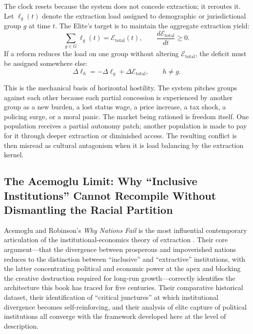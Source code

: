 The clock resets because the system does not concede extraction; it reroutes it. Let $\ell_g(t)$ denote the extraction load assigned to demographic or jurisdictional group $g$ at time $t$. The Elite's target is to maintain the aggregate extraction yield:
\begin{equation}\label{eq:12.2a-load-balancing}
\sum_{g \in G} \ell_g(t) = \mathcal{E}_{\text{total}}(t),
\qquad
\frac{d\mathcal{E}_{\text{total}}}{dt} \geq 0 .
\end{equation}
If a reform reduces the load on one group without altering $\mathcal{E}_{\text{total}}$, the deficit must be assigned somewhere else:
\begin{equation}\label{eq:12.2b-load-transfer}
\Delta \ell_h
=
-\Delta \ell_g
+ \Delta \mathcal{E}_{\text{total}},
\qquad h \neq g .
\end{equation}

This is the mechanical basis of horizontal hostility. The system pitches groups against each other because each partial concession is experienced by another group as a new burden, a lost status wage, a price increase, a tax shock, a policing surge, or a moral panic. The market being rationed is freedom itself. One population receives a partial autonomy patch; another population is made to pay for it through deeper extraction or diminished access. The resulting conflict is then misread as cultural antagonism when it is load balancing by the extraction kernel.

\subsection{The Acemoglu Limit: Why ``Inclusive Institutions'' Cannot Recompile Without Dismantling the Racial Partition}
\label{sec:acemoglu_limit}

Acemoglu and Robinson's \textit{Why Nations Fail} is the most influential contemporary articulation of the institutional-economics theory of extraction \cite{acemoglu_robinson}. Their core argument---that the divergence between prosperous and impoverished nations reduces to the distinction between ``inclusive'' and ``extractive'' institutions, with the latter concentrating political and economic power at the apex and blocking the creative destruction required for long-run growth---correctly identifies the architecture this book has traced for five centuries. Their comparative historical dataset, their identification of ``critical junctures'' at which institutional divergence becomes self-reinforcing, and their analysis of elite capture of political institutions all converge with the framework developed here at the level of description.

